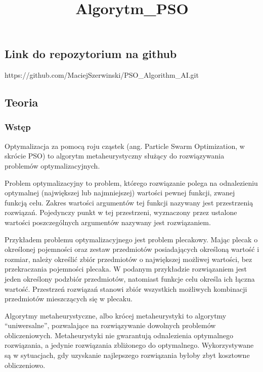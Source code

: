 \documentclass[11pt]{article}
\title{Algorytm\_PSO}
\begin{document}
    
    \maketitle
    
    

    
    \hypertarget{link-do-repozytorium-na-github}{%
\subsection{Link do repozytorium na
github}\label{link-do-repozytorium-na-github}}

https://github.com/MaciejSzerwinski/PSO\_Algorithm\_AI.git

    \hypertarget{teoria}{%
\subsection{Teoria}\label{teoria}}

\hypertarget{wstux119p}{%
\subsubsection{Wstęp}\label{wstux119p}}

Optymalizacja za pomocą roju cząstek (ang. Particle Swarm Optimization,
w skrócie PSO) to algorytm metaheurystyczny służący do rozwiązywania
problemów optymalizacyjnych.

Problem optymalizacyjny to problem, którego rozwiązanie polega na
odnalezieniu optymalnej (największej lub najmniejszej) wartości pewnej
funkcji, zwanej funkcją celu. Zakres wartości argumentów tej funkcji
nazywany jest przestrzenią rozwiązań. Pojedynczy punkt w tej
przestrzeni, wyznaczony przez ustalone wartości poszczególnych
argumentów nazywany jest rozwiązaniem.

Przykładem problemu optymalizacyjnego jest problem plecakowy. Mając
plecak o określonej pojemności oraz zestaw przedmiotów posiadających
określoną wartość i rozmiar, należy określić zbiór przedmiotów o
największej możliwej wartości, bez przekraczania pojemności plecaka. W
podanym przykładzie rozwiązaniem jest jeden określony podzbiór
przedmiotów, natomiast funkcje celu określa ich łączna wartość.
Przestrzeń rozwiązań stanowi zbiór wszystkich możliwych kombinacji
przedmiotów mieszczących się w plecaku.

Algorytmy metaheurystyczne, albo krócej metaheurystyki to algorytmy
``uniwersalne'', pozwalające na rozwiązywanie dowolnych problemów
obliczeniowych. Metaheurystyki nie gwarantują odnalezienia optymalnego
rozwiązania, a jedynie rozwiązania zbliżonego do optymalnego.
Wykorzystywane są w sytuacjach, gdy uzyskanie najlepszego rozwiązania
byłoby zbyt kosztowne obliczeniowo.
\end{document}
